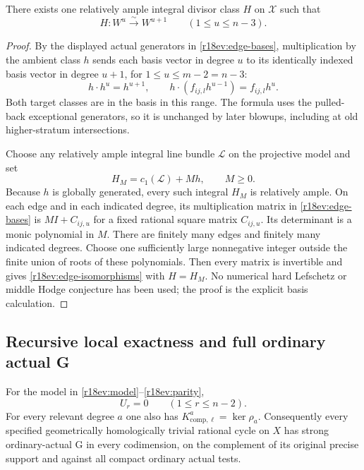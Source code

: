 \begin{lemma}
\label{r18ev:ample-isomorphisms}
There exists one relatively ample integral divisor class $H$
on $\mathcal X$ such that
\[
            H:W^u\xrightarrow{\ \sim\ }W^{u+1}
                         \qquad(1\le u\le n-3).
 \tag{EV18.8}\label{r18ev:edge-isomorphisms}
\]
\end{lemma}

\begin{proof}
By the displayed actual generators in
\eqref{r18ev:edge-bases}, multiplication by the ambient class
$h$ sends each basis vector in degree $u$ to its identically
indexed basis vector in degree $u+1$, for
$1\le u\le m-2=n-3$:
\[
           h\cdot h^u=h^{u+1},\qquad
           h\cdot(f_{ij,l}h^{u-1})=f_{ij,l}h^u.
 \tag{EV18.9}\label{r18ev:ambient-isomorphism}
\]
Both target classes are in the basis in this range.
The formula uses the pulled-back exceptional generators,
so it is unchanged by later blowups, including at old
higher-stratum intersections.

Choose any relatively ample integral line bundle
$\mathcal L$ on the projective model and set
\[
                      H_M=c_1(\mathcal L)+M h,\qquad M\ge0.
\]
Because $h$ is globally generated, every such integral
$H_M$ is relatively ample.
On each edge and in each indicated degree, its multiplication
matrix in \eqref{r18ev:edge-bases} is
$M I+C_{ij,u}$ for a fixed rational square matrix $C_{ij,u}$.
Its determinant is a monic polynomial in $M$.
There are finitely many edges and finitely many indicated
degrees.  Choose one sufficiently large nonnegative integer
outside the finite union of roots of these polynomials.
Then every matrix is invertible and gives
\eqref{r18ev:edge-isomorphisms} with $H=H_M$.
No numerical hard Lefschetz or middle Hodge conjecture has
been used; the proof is the explicit basis calculation.
\end{proof}

\subsection{Recursive local exactness and full ordinary actual G}

\begin{theorem}
\label{r18ev:defects}
For the model in \eqref{r18ev:model}--\eqref{r18ev:parity},
\[
                         U_r=0\qquad(1\le r\le n-2).
 \tag{EV18.10}\label{r18ev:Urzero}
\]
For every relevant degree $a$ one also has
$K_{\mathrm{comp},\ell}^a=\ker\rho_a$.
Consequently every specified geometrically homologically
trivial rational cycle on $X$ has strong ordinary-actual G
in every codimension, on the complement of its original
precise support and against all compact ordinary actual tests.
\end{theorem}


